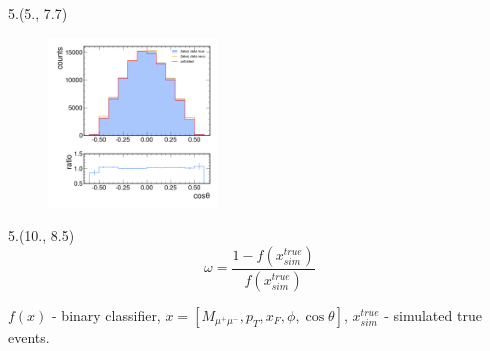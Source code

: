 \documentclass[10pt, xcolor={dvipsnames}, sans, mathserif, aspectratio=169]{beamer}
\newenvironment{Pic}[2]
{\begin{textblock}{#1}#2
\begin{figure}}
{\end{figure}
\end{textblock}}
\begin{document}
\begin{frame}
\begin{Pic}{5.}{(5., 7.7)}
	\includegraphics[width=4.5cm]{omnifold_costh.png}
\end{Pic}

\begin{textblock}{5.}(10., 8.5)
\begin{equation*}
	\omega = \frac{1 - f(x_{sim}^{true})}{f(x_{sim}^{true})}
\end{equation*}

$f(x)$ - binary classifier,  $x = [M_{\mu^{+}\mu^{-}}, p_{T}, x_{F}, \phi, \cos\theta]$, 
$x_{sim}^{true}$ - simulated true events.
\end{textblock}

\end{frame}
\end{document}
